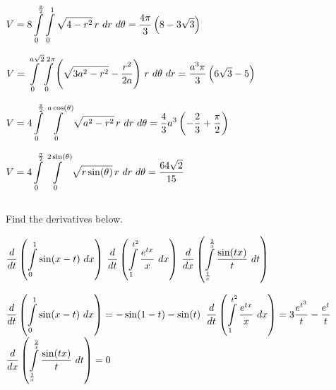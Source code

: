 \begin{Answer}
    
        \Question $V = 8 \displaystyle \int\limits_0^{\frac{\pi}{2}} \displaystyle \int\limits_0^{1} \sqrt{4 - r^2}\, r \ dr\ d\theta  = \dfrac{4 \pi}{3}\left(8-3\sqrt{3}\right)$

        \Question $V = \displaystyle \int\limits_0^{a\sqrt{2}} \displaystyle \int\limits_0^{2\pi} \left(\sqrt{3a^2-r^2} - \dfrac{r^2}{2a}  \right)\, r\ d\theta \ dr = \dfrac{a^3\pi}{3}\left( 6\sqrt{3} - 5 \right)$

        \Question $V = 4 \displaystyle \int\limits_0^{\frac{\pi}{2}} \displaystyle \int\limits_0^{a\cos(\theta)} \sqrt{a^2 - r^2}\, r \ dr \ d\theta  = \dfrac{4}{3}a^3 \left(- \dfrac{2}{3} + \dfrac{\pi}{2} \right)$
        
        \Question $V = 4 \ds \int\limits_0^{\frac{\pi}{2}} \ds \int\limits_0^{2\sin(\theta)} \sqrt{r \sin(\theta)}\, r  \ dr \ d\theta = \dfrac{64 \sqrt{2}}{15}$
    
    
\end{Answer}

\pagebreak
\subsection*{}
\begin{Exercise} Find the derivatives below.
\begin{multicols}{2}
    \Question[difficulty = 1] $\dfrac{d}{dt} \left( \displaystyle \int\limits_{0}^1 \sin (x-t)\ dx \right)$ %
    \Question[difficulty = 2] $\dfrac{d}{dt} \left( \displaystyle \int\limits_{1}^{t^2} \dfrac{e^{tx}}{x} \ dx \right)$ 
    \Question[difficulty = 3] $\dfrac{d}{dx} \left( \displaystyle \int\limits_{\frac{1}{x}}^{\frac{2}{x}} \dfrac{\sin (tx)}{t} \ dt \right)$ 
    \EndCurrentQuestion
\end{multicols}
\end{Exercise}

\begin{Answer}
    
        \Question $\dfrac{d}{dt} \left( \displaystyle \int\limits_{0}^1 \sin (x-t)\ dx \right) = -\sin(1-t)-\sin(t)$ 
        \Question $\dfrac{d}{dt} \left( \displaystyle \int\limits_{1}^{t^2} \dfrac{e^{tx}}{x} \ dx \right) = 3\dfrac{e^{t^3}}{t} - \dfrac{e^{t}}{t} $ 
        \Question $\dfrac{d}{dx} \left( \displaystyle \int\limits_{\frac{1}{x}}^{\frac{2}{x}} \dfrac{\sin (tx)}{t} \ dt \right)=0$ 
       
    
\end{Answer}

